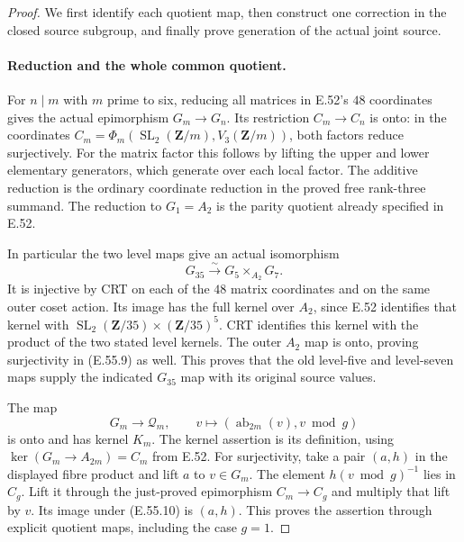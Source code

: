 \begin{proof}
We first identify each quotient map, then construct
one correction in the closed source subgroup, and
finally prove generation of the actual joint source.

\paragraph{Reduction and the whole common quotient.}
For $n\mid m$ with $m$ prime to six, reducing all
matrices in E.52's $48$ coordinates gives the actual
epimorphism $G_m\to G_n$. Its restriction
$C_m\to C_n$ is onto: in the coordinates
$C_m=\Phi_m(\operatorname{SL}_2(\mathbf Z/m),V_3(\mathbf Z/m))$,
both factors reduce surjectively.
For the matrix factor this follows by lifting the
upper and lower elementary generators, which generate
over each local factor. The additive reduction is
the ordinary coordinate reduction in the proved
free rank-three summand. The reduction to $G_1=A_2$
is the parity quotient already specified in E.52.

In particular the two level maps give an actual
isomorphism
\[
                  G_{35}\xrightarrow{\sim}G_5\times_{A_2}G_7.
 \tag{E.55.9}
\]
It is injective by CRT on each of the $48$ matrix
coordinates and on the same outer coset action.
Its image has the full kernel over $A_2$, since
E.52 identifies that kernel with
$\operatorname{SL}_2(\mathbf Z/35)\times(\mathbf Z/35)^5$.
CRT identifies this kernel with the product of
the two stated level kernels. The outer $A_2$
map is onto, proving surjectivity in
\textup{(E.55.9)} as well.
This proves that the old level-five and level-seven
maps supply the indicated $G_{35}$ map with its
original source values.

The map
\[
 G_m\longrightarrow\mathcal Q_m,
       \qquad v\longmapsto(\operatorname{ab}_{2m}(v),v\bmod g)
 \tag{E.55.10}
\]
is onto and has kernel $K_m$.
The kernel assertion is its definition, using
$\ker(G_m\to A_{2m})=C_m$ from E.52.
For surjectivity, take a pair $(a,h)$ in the
displayed fibre product and lift $a$ to $v\in G_m$.
The element $h(v\bmod g)^{-1}$ lies in $C_g$.
Lift it through the just-proved epimorphism
$C_m\to C_g$ and multiply that lift by $v$.
Its image under \textup{(E.55.10)} is $(a,h)$.
This proves the assertion through explicit
quotient maps, including the case $g=1$.


\end{proof}

